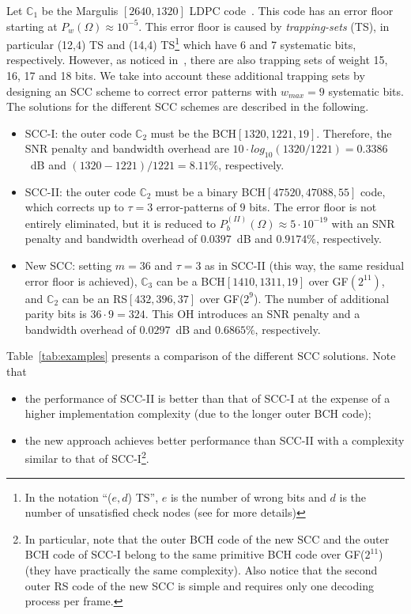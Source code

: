\documentclass[conference]{IEEEtran}
\newcommand{\C}{\mathbb{C}}  %
\begin{document}
Let $\C_1$ be the Margulis $[2640,1320]$ LDPC
code~\cite{MacKay03}. This code has an error floor starting at
$P_w(\Omega)\approx 10^{-5}$. This error floor is caused by
\textit{trapping-sets} (TS), in particular (12,4) TS and (14,4)
TS\footnote{In the notation ``($e,d$) TS'', $e$ is the number of wrong
  bits and $d$ is the number of unsatisfied check nodes (see
  \cite{MacKay03,4601062} for more details)} which have 6 and 7
systematic bits, respectively. However, as noticed in~\cite{4601062},
there are also trapping sets of weight 15, 16, 17 and 18 bits. We take
into account these additional trapping sets by designing an SCC scheme
to correct error patterns with $w_{max}=9$ systematic bits. The
solutions for the different SCC schemes are described in the
following.
\begin{itemize}
\item SCC-I: the outer code $\C_2$ must be the
  BCH$[1320,1221,19]$. Therefore, the SNR penalty and bandwidth
  overhead are $10\cdot log_{10}(1320/1221)=0.3386$~dB and
  $(1320-1221)/1221= 8.11\%$, respectively.
\item SCC-II: the outer code $\C_2$ must be a binary
  BCH$[47520,47088,55]$ code, which corrects up to $\tau=3$
  error-patterns of $9$ bits. The error floor is not entirely
  eliminated, but it is reduced to $P_b^{(I\!I)}(\Omega)\approx 5\cdot
  10^{-19}$ with an SNR penalty and bandwidth overhead of $0.0397$~dB
  and $0.9174\%$, respectively.
\item New SCC: setting $m=36$ and $\tau=3$ as in SCC-II (this way, the
  same residual error floor is achieved), $\C_3$ can be a
  BCH$[1410,1311,19]$ over GF$(2^{11})$, and $\C_2$ can be an
  RS$[432,396,37]$ over GF($2^{9}$). The number of additional parity
  bits is $36\cdot 9=324$. This OH introduces an SNR penalty and a
  bandwidth overhead of $0.0297$~dB and $0.6865\%$, respectively.
\end{itemize}
 
Table~\ref{tab:examples} presents a comparison of the different SCC
solutions. Note that
\begin{itemize}
\item the performance of SCC-II is better than that of SCC-I at the
  expense of a higher implementation complexity (due to the longer
  outer BCH code);
\item the new approach achieves better performance than SCC-II with a
  complexity similar to that of SCC-I\footnote{In particular, note
    that the outer BCH code of the new SCC and the outer BCH code of
    SCC-I belong to the same primitive BCH code over GF($2^{11}$)
    (they have practically the same complexity). Also notice that the
    second outer RS code of the new SCC is simple and requires only
    one decoding process per frame.}.
\end{itemize}
\end{document}
